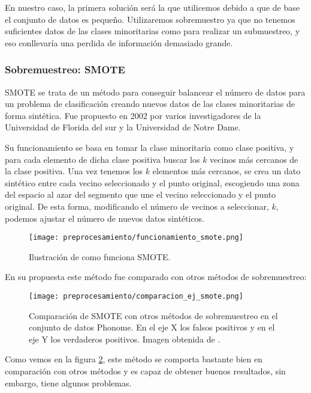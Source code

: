En nuestro caso, la primera solución será la que utilicemos debido a que de base el conjunto de datos es pequeño. Utilizaremos sobremuestro ya que no tenemos suficientes datos de las clases minoritarias como para realizar un submuestreo, y eso conllevaría una perdida de información demasiado grande.

\newpage

\subsubsection{Sobremuestreo: SMOTE}

SMOTE \cite{SMOTE} se trata de un método para conseguir balancear el número de datos para un problema de clasificación creando nuevos datos de las clases minoritarias de forma sintética. Fue propuesto en 2002 por varios investigadores de la Universidad de Florida del sur y la Universidad de Notre Dame.

Su funcionamiento se basa en tomar la clase minoritaria como clase positiva, y para cada elemento de dicha clase positiva buscar los $k$ vecinos más cercanos de la clase positiva. Una vez tenemos los $k$ elementos más cercanos, se crea un dato sintético entre cada vecino seleccionado y el punto original, escogiendo una zona del espacio al azar del segmento que une el vecino seleccionado y el punto original. De esta forma, modificando el número de vecinos a seleccionar, $k$, podemos ajustar el número de nuevos datos sintéticos.

\begin{figure}[H]
	\centering
	\texttt{[image: preprocesamiento/funcionamiento\_smote.png]}
	\caption{Ilustración de como funciona SMOTE.}
	\label{fig:funcionamiento_smote}
\end{figure}

\newpage

En su propuesta este método fue comparado con otros métodos de sobremuestreo:

\begin{figure}[H]
	\centering
	\texttt{[image: preprocesamiento/comparacion\_ej\_smote.png]}
	\caption{Comparación de SMOTE con otros métodos de sobremuestreo en el conjunto de datos Phonome. En el eje X los falsos positivos y en el eje Y los verdaderos positivos. Imagen obtenida de \cite{SMOTE}.}
	\label{fig:comparacionSMOTE}
\end{figure}

Como vemos en la figura \ref{fig:comparacionSMOTE}, este método se comporta bastante bien en comparación con otros métodos y es capaz de obtener buenos resultados, sin embargo, tiene algunos problemas.

